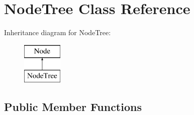 \hypertarget{class_node_tree}{}\section{Node\+Tree Class Reference}
\label{class_node_tree}
Inheritance diagram for Node\+Tree\+:\begin{figure}[H]
\begin{center}
\leavevmode
\includegraphics[height=2.000000cm]{class_node_tree}
\end{center}
\end{figure}
\subsection*{Public Member Functions}
